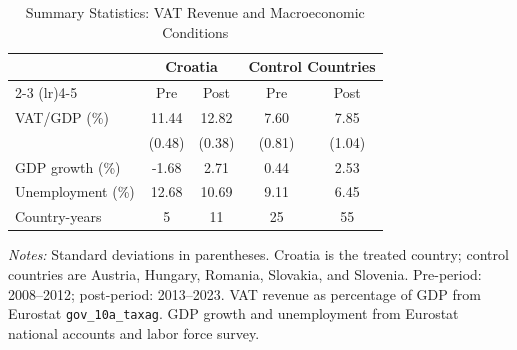 \begin{table}[htbp]
\centering
\caption{Summary Statistics: VAT Revenue and Macroeconomic Conditions}
\label{tab:sumstats}
\begin{tabular}{lcccc}
\hline\hline
 & \multicolumn{2}{c}{Croatia} & \multicolumn{2}{c}{Control Countries} \\
\cmidrule(lr){2-3} \cmidrule(lr){4-5}
 & Pre & Post & Pre & Post \\
\hline
VAT/GDP (\%) & 11.44 & 12.82 & 7.60 & 7.85 \\
 & (0.48) & (0.38) & (0.81) & (1.04) \\
GDP growth (\%) & -1.68 & 2.71 & 0.44 & 2.53 \\
Unemployment (\%) & 12.68 & 10.69 & 9.11 & 6.45 \\
Country-years & 5 & 11 & 25 & 55 \\
\hline\hline
\end{tabular}
\begin{tablenotes}[flushleft]
\footnotesize
\item \textit{Notes:} Standard deviations in parentheses. Croatia is the treated country; control countries are Austria, Hungary, Romania, Slovakia, and Slovenia. Pre-period: 2008--2012; post-period: 2013--2023. VAT revenue as percentage of GDP from Eurostat \texttt{gov\_10a\_taxag}. GDP growth and unemployment from Eurostat national accounts and labor force survey.
\end{tablenotes}
\end{table}


